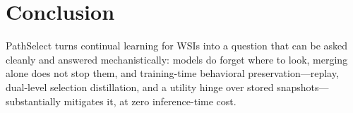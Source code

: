 \documentclass{article}
\begin{document}
\section{Conclusion}
\label{sec:conclusion}
PathSelect turns continual learning for WSIs into a question that can be asked cleanly and answered mechanistically: models do forget where to look, merging alone does not stop them, and training-time behavioral preservation---replay, dual-level selection distillation, and a utility hinge over stored snapshots---substantially mitigates it, at zero inference-time cost.




\end{document}
